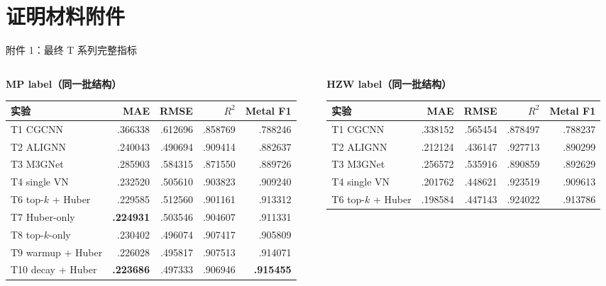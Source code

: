 \documentclass[aspectratio=169]{beamer}
\newif\ifreportappendix
\begin{document}
\reportappendixtrue
\section{证明材料附件}

\begin{frame}{附件 1：最终 T 系列完整指标}
\tiny
\setlength{\columnsep}{0pt}
\setlength{\tabcolsep}{1.5pt}
\begin{columns}[T,onlytextwidth,totalwidth=\textwidth]
\begin{column}{0.49\textwidth}
\centering
\textbf{MP label（同一批结构）}\\[1mm]
\begin{tabular}{lrrrr}
\toprule
实验 & MAE & RMSE & $R^2$ & Metal F1 \\
\midrule
T1 CGCNN & .366338 & .612696 & .858769 & .788246 \\
T2 ALIGNN & .240043 & .490694 & .909414 & .882637 \\
T3 M3GNet & .285903 & .584315 & .871550 & .889726 \\
T4 single VN & .232520 & .505610 & .903823 & .909240 \\
T6 top-$k$ + Huber & .229585 & .512560 & .901161 & .913312 \\
T7 Huber-only & \textbf{.224931} & .503546 & .904607 & .911331 \\
T8 top-$k$-only & .230402 & .496074 & .907417 & .905809 \\
T9 warmup + Huber & .226028 & .495817 & .907513 & .914071 \\
T10 decay + Huber & \textbf{.223686} & .497333 & .906946 & \textbf{.915455} \\
\bottomrule
\end{tabular}
\end{column}
\begin{column}{0.49\textwidth}
\centering
\textbf{HZW label（同一批结构）}\\[1mm]
\begin{tabular}{lrrrr}
\toprule
实验 & MAE & RMSE & $R^2$ & Metal F1 \\
\midrule
T1 CGCNN & .338152 & .565454 & .878497 & .788237 \\
T2 ALIGNN & .212124 & .436147 & .927713 & .890299 \\
T3 M3GNet & .256572 & .535916 & .890859 & .892629 \\
T4 single VN & .201762 & .448621 & .923519 & .909613 \\
T6 top-$k$ + Huber & .198584 & .447143 & .924022 & .913786 \\

\end{tabular}
\end{column}
\end{columns}
\end{frame}
\end{document}
